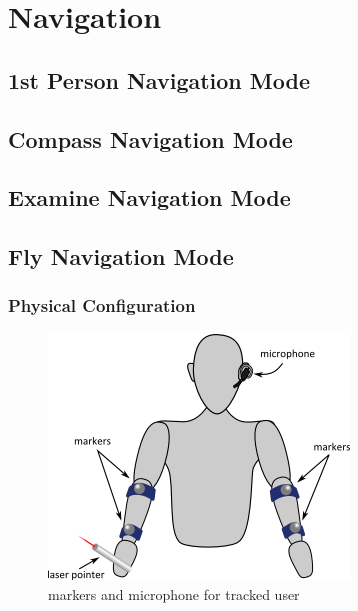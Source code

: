 
\section{Navigation}

\subsection{1st Person Navigation Mode}

\subsection{Compass Navigation Mode}

\subsection{Examine Navigation Mode}

\subsection{Fly Navigation Mode}


\subsubsection{Physical Configuration}



\begin{figure}[!ht]
		\centering
		\includegraphics[width=8cm]{gfx/markers2.png}
		\caption{markers and microphone for tracked user}
		\label{fig:markers}
\end{figure}

